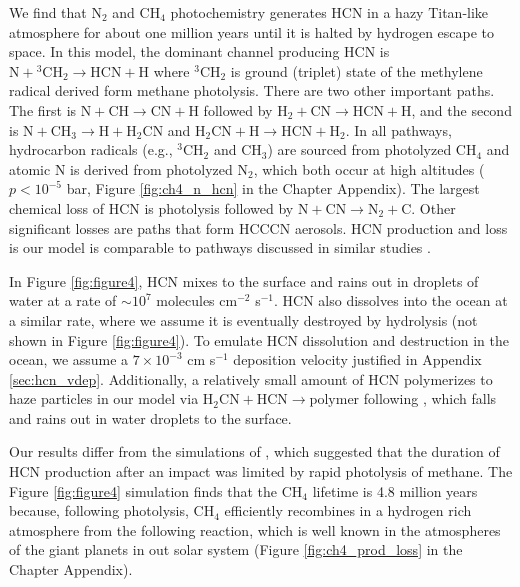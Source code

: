 We find that N$_2$ and CH$_4$ photochemistry generates HCN in a hazy Titan-like atmosphere for about one million years until it is halted by hydrogen escape to space. In this model, the dominant channel producing HCN is $\mathrm{N} + \mathrm{^3CH_2} \rightarrow \mathrm{HCN} + \mathrm{H}$ where $\mathrm{^3CH_2}$ is ground (triplet) state of the methylene radical derived form methane photolysis. There are two other important paths. The first is $\mathrm{N} + \mathrm{CH} \rightarrow \mathrm{CN} + \mathrm{H}$ followed by $\mathrm{H_2} + \mathrm{CN} \rightarrow \mathrm{HCN} + \mathrm{H}$, and the second is $\mathrm{N} + \mathrm{CH_3} \rightarrow \mathrm{H} + \mathrm{H_2CN}$ and $\mathrm{H_2CN} + \mathrm{H} \rightarrow \mathrm{HCN} + \mathrm{H_2}$. In all pathways, hydrocarbon radicals (e.g., $\mathrm{^3CH_2}$ and $\mathrm{CH_3}$) are sourced from photolyzed CH$_4$ and atomic N is derived from photolyzed N$_2$, which both occur at high altitudes ($p < 10^{-5}$ bar, Figure \ref{fig:ch4_n_hcn} in the Chapter Appendix). The largest chemical loss of HCN is photolysis followed by $\mathrm{N} + \mathrm{CN} \rightarrow \mathrm{N_2} + \mathrm{C}$. Other significant losses are paths that form HCCCN aerosols. HCN production and loss is our model is comparable to pathways discussed in similar studies \citep{Zahnle_1986,Tian_2011,Rimmer_2019}.

In Figure \ref{fig:figure4}, HCN mixes to the surface and rains out in droplets of water at a rate of $\sim 10^7$ molecules cm$^{-2}$ s$^{-1}$. HCN also dissolves into the ocean at a similar rate, where we assume it is eventually destroyed by hydrolysis (not shown in Figure \ref{fig:figure4}). To emulate HCN dissolution and destruction in the ocean, we assume a $7 \times 10^{-3}$ cm s$^{-1}$ deposition velocity justified in Appendix \ref{sec:hcn_vdep}. Additionally, a relatively small amount of HCN polymerizes to haze particles in our model via $\mathrm{H_2CN} + \mathrm{HCN} \rightarrow \mathrm{polymer}$ following \citet{Lavvas_2008}, which falls and rains out in water droplets to the surface.

Our results differ from the simulations of \citet{Zahnle_2020}, which suggested that the duration of HCN production after an impact was limited by rapid photolysis of methane. The Figure \ref{fig:figure4} simulation finds that the CH$_4$ lifetime is 4.8 million years because, following photolysis, CH$_4$ efficiently recombines in a hydrogen rich atmosphere from the following reaction, which is well known in the atmospheres of the giant planets in out solar system (Figure \ref{fig:ch4_prod_loss} in the Chapter Appendix).

